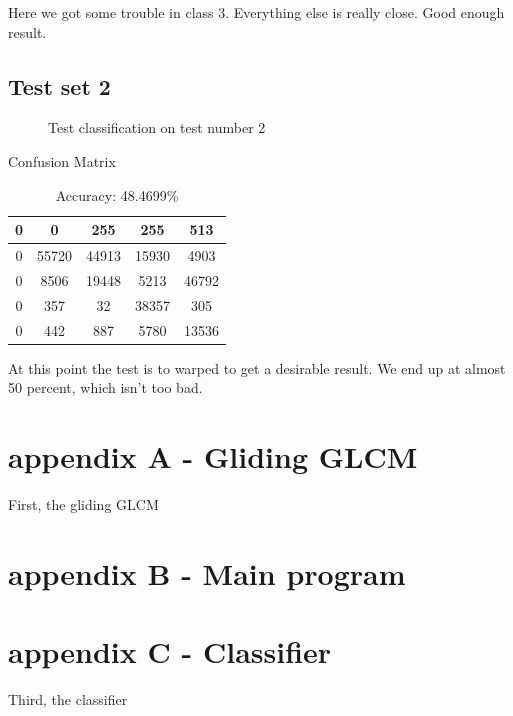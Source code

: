 \documentclass{article}
\begin{document}
	Here we got some trouble in class 3. Everything else is really close. Good enough result.
	\newpage 
\subsection{Test set 2}

	\begin{figure}[h!]%
		\centering
    	\caption{Test classification on test number 2}%
    	\label{fig:f2}%
	\end{figure}
	\begin{table}
\centering
Confusion Matrix\\
\begin{tabular}{c | c | c | c | c}
  0  & 0     & 255   & 255   & 513   \\\hline
  0  & 55720 & 44913 & 15930 & 4903  \\\hline
  0  & 8506  & 19448 & 5213  & 46792 \\\hline
  0  & 357   & 32    & 38357 & 305   \\\hline
  0  & 442   & 887   & 5780  & 13536 \\\hline
\end{tabular}
\caption {Accuracy: 48.4699\%}
\end{table}
	At this point the test is to warped to get a desirable result. We end up at almost 50 percent, which isn't too bad.


\newpage
\newpage
\newpage


\section{appendix A - Gliding GLCM}
	First, the gliding GLCM
	

	\newpage
\section{appendix B - Main program}
	

	\newpage
\section{appendix C - Classifier}
	Third, the classifier 
	
    
\end{document}
